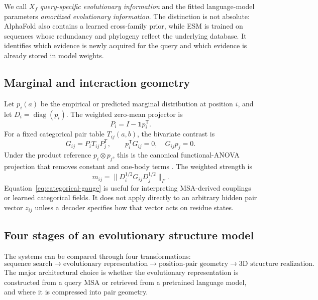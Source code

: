 \documentclass[10pt]{article}
\newcommand{\diag}{\operatorname{diag}}
\begin{document}
We call $X_f$ \emph{query-specific evolutionary information} and the fitted language-model
parameters \emph{amortized evolutionary information}.  The distinction is not absolute: AlphaFold
also contains a learned cross-family prior, while ESM is trained on sequences whose redundancy and
phylogeny reflect the underlying database.  It identifies which evidence is newly acquired for the
query and which evidence is already stored in model weights.

\subsection{Marginal and interaction geometry}

Let $p_i(a)$ be the empirical or predicted marginal distribution at position $i$, and let
$D_i=\diag(p_i)$.  The weighted zero-mean projector is
\begin{equation}
P_i=I-\mathbf1p_i^{\mathsf T}.
\label{eq:categorical-projector}
\end{equation}
For a fixed categorical pair table $T_{ij}(a,b)$, the bivariate contrast is
\begin{equation}
G_{ij}=P_iT_{ij}P_j^{\mathsf T},
\qquad
p_i^{\mathsf T}G_{ij}=0,\quad G_{ij}p_j=0.
\label{eq:categorical-gauge}
\end{equation}
Under the product reference $p_i\otimes p_j$, this is the canonical functional-ANOVA projection
that removes constant and one-body terms \cite{hoeffding1948}.  The weighted strength is
\begin{equation}
m_{ij}=\|D_i^{1/2}G_{ij}D_j^{1/2}\|_F.
\label{eq:weighted-pair-strength}
\end{equation}
Equation~\ref{eq:categorical-gauge} is useful for interpreting MSA-derived couplings or learned
categorical fields.  It does not apply directly to an arbitrary hidden pair vector $z_{ij}$ unless
a decoder specifies how that vector acts on residue states.

\subsection{Four stages of an evolutionary structure model}

The systems can be compared through four transformations:
\begin{equation}
\boxed{
\text{sequence search}
\longrightarrow
\text{evolutionary representation}
\longrightarrow
\text{position-pair geometry}
\longrightarrow
\text{3D structure realization}.}
\label{eq:four-stage-pipeline}
\end{equation}
The major architectural choice is whether the evolutionary representation is constructed from a
query MSA or retrieved from a pretrained language model, and where it is compressed into pair
geometry.
\end{document}
